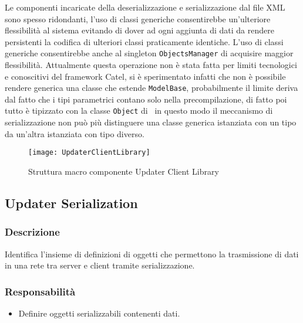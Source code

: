\documentclass[../RelazioneFinale.tex]{subfiles}
\begin{document}
				Le componenti incaricate della deserializzazione e serializzazione dal file XML sono spesso ridondanti, l'uso di classi generiche consentirebbe un'ulteriore flessibilità al sistema evitando di dover ad ogni aggiunta di dati da rendere persistenti la codifica di ulteriori classi praticamente identiche. L'uso di classi generiche consentirebbe anche al singleton \verb|ObjectsManager| di acquisire maggior flessibilità. Attualmente questa operazione non è stata fatta per limiti tecnologici e conoscitivi del framework Catel, si è sperimentato infatti che non è possibile rendere generica una classe che estende \verb|ModelBase|, probabilmente il limite deriva dal fatto che i tipi parametrici contano solo nella precompilazione, di fatto poi tutto è tipizzato con la classe \verb|Object| di \Csharp\, in questo modo il meccanismo di serializzazione non può più distinguere una classe generica istanziata con un tipo da un'altra istanziata con tipo diverso.
				
							
			\begin{figure}[p]
				\texttt{[image: UpdaterClientLibrary]}
				\label{fig:UpdaterClientLibrary}
				\caption{Struttura macro componente Updater Client Library}
			\end{figure}
		
\newpage
		
		\subsection{Updater Serialization}
		
			\subsubsection{Descrizione}
				Identifica l'insieme di definizioni di oggetti che permettono la trasmissione di dati in una rete tra server e client tramite serializzazione.
			
			\subsubsection{Responsabilità}
				\begin{itemize}
					\item Definire oggetti serializzabili contenenti dati.
				\end{itemize}
			
\end{document}
